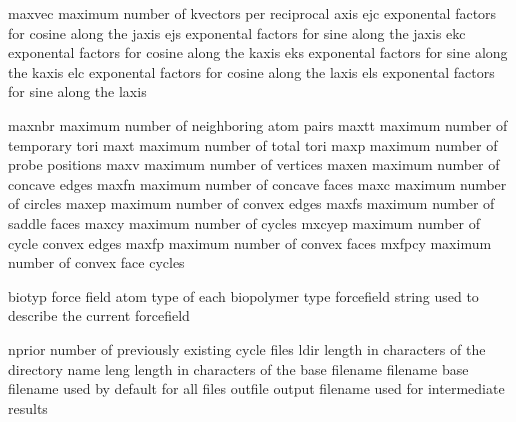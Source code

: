 \documentclass[letterpaper,11pt,english]{sphinxmanual}
\begin{document}
\begin{sphinxVerbatim}[commandchars=\\\{\}]
maxvec          maximum number of k\PYGZhy{}vectors per reciprocal axis
ejc             exponental factors for cosine along the j\PYGZhy{}axis
ejs             exponental factors for sine along the j\PYGZhy{}axis
ekc             exponental factors for cosine along the k\PYGZhy{}axis
eks             exponental factors for sine along the k\PYGZhy{}axis
elc             exponental factors for cosine along the l\PYGZhy{}axis
els             exponental factors for sine along the l\PYGZhy{}axis
\end{sphinxVerbatim}


\begin{sphinxVerbatim}[commandchars=\\\{\}]
maxnbr          maximum number of neighboring atom pairs
maxtt           maximum number of temporary tori
maxt            maximum number of total tori
maxp            maximum number of probe positions
maxv            maximum number of vertices
maxen           maximum number of concave edges
maxfn           maximum number of concave faces
maxc            maximum number of circles
maxep           maximum number of convex edges
maxfs           maximum number of saddle faces
maxcy           maximum number of cycles
mxcyep          maximum number of cycle convex edges
maxfp           maximum number of convex faces
mxfpcy          maximum number of convex face cycles
\end{sphinxVerbatim}


\begin{sphinxVerbatim}[commandchars=\\\{\}]
biotyp          force field atom type of each biopolymer type
forcefield      string used to describe the current forcefield
\end{sphinxVerbatim}


\begin{sphinxVerbatim}[commandchars=\\\{\}]
nprior          number of previously existing cycle files
ldir            length in characters of the directory name
leng            length in characters of the base filename
filename        base filename used by default for all files
outfile         output filename used for intermediate results
\end{sphinxVerbatim}
\end{document}
